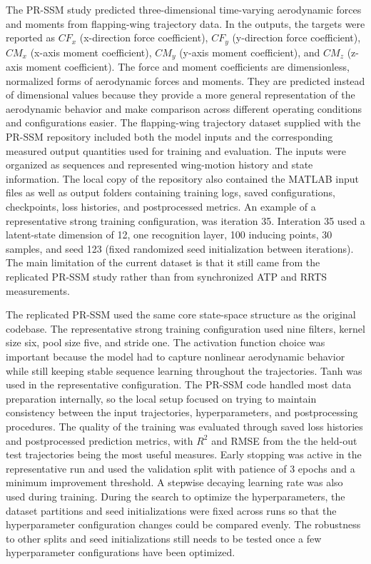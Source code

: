 The PR-SSM study predicted three-dimensional time-varying aerodynamic forces and moments from flapping-wing trajectory data. In the outputs, the targets were reported as $CF_x$ (x-direction force coefficient), $CF_y$ (y-direction force coefficient), $CM_x$ (x-axis moment coefficient), $CM_y$ (y-axis moment coefficient), and $CM_z$ (z-axis moment coefficient). The force and moment coefficients are dimensionless, normalized forms of aerodynamic forces and moments. They are predicted instead of dimensional values because they provide a more general representation of the aerodynamic behavior and make comparison across different operating conditions and configurations easier. The flapping-wing trajectory dataset supplied with the PR-SSM repository \cite{BayizPRSSMRepo} included both the model inputs and the corresponding measured output quantities used for training and evaluation. The inputs were organized as sequences and represented wing-motion history and state information. The local copy of the repository also contained the MATLAB input files as well as output folders containing training logs, saved configurations, checkpoints, loss histories, and postprocessed metrics. An example of a representative strong training configuration, was iteration 35. Interation 35 used a latent-state dimension of 12, one recognition layer, 100 inducing points, 30 samples, and seed 123 (fixed randomized seed initialization between iterations). The main limitation of the current dataset is that it still came from the replicated PR-SSM study rather than from synchronized ATP and RRTS measurements.

The replicated PR-SSM used the same core state-space structure as the original codebase. The representative strong training configuration used nine filters, kernel size six, pool size five, and stride one. The activation function choice was important because the model had to capture nonlinear aerodynamic behavior while still keeping stable sequence learning throughout the trajectories. Tanh was used in the representative configuration. The PR-SSM code handled most data preparation internally, so the local setup focused on trying to maintain consistency between the input trajectories, hyperparameters, and postprocessing procedures. The quality of the training was evaluated through saved loss histories and postprocessed prediction metrics, with $R^2$ and RMSE from the the held-out test trajectories being the most useful measures. Early stopping was active in the representative run and used the validation split with patience of 3 epochs and a minimum improvement threshold. A stepwise decaying learning rate was also used during training. During the search to optimize the hyperparameters, the dataset partitions and seed initializations were fixed across runs so that the hyperparameter configuration changes could be compared evenly. The robustness to other splits and seed initializations still needs to be tested once a few hyperparameter configurations have been optimized.

